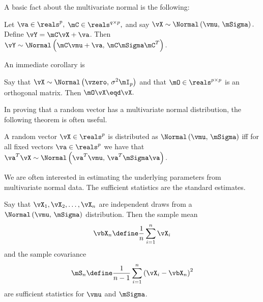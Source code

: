 A basic fact about the multivariate normal is the following:

\begin{proposition}\label{P:scale-shift-normal}
Let 
\(
    \va \in \reals^p,
\)
\(
    \mC \in \reals^{q \times p},
\)
and say
\(
    \vX 
    \sim
    \Normal \left( 
        \vmu, \,
        \mSigma
    \right).
\)
Define $\vY = \mC \vX + \va$.  Then 
\(
    \vY
    \sim
    \Normal \left( 
        \mC \vmu + \va, \,
        \mC \mSigma \mC^T
    \right).
\)
\end{proposition}

\noindent
An immediate corollary is

\begin{corollary}\label{C:normal-orthog-invariant}
Say that
\(
    \vX 
    \sim 
    \Normal \left( 
        \vzero, \,
        \sigma^2 \mI_p
    \right)
\)
and that
\(
    \mO \in \reals^{p \times p}
\)
is an orthogonal matrix.  Then
\(
    \mO \vX \eqd \vX.
\)
\end{corollary}

In proving that a random vector has a multivariate normal distribution,
the following theorem is often useful.

\begin{theorem}\label{T:cramer-wold}
A random vector
\(
    \vX \in \reals^p
\)
is distributed as 
\(
    \Normal \left(
        \vmu, \,
        \mSigma
    \right)
\)
iff for all fixed vectors
\(
    \va \in \reals^p
\)
we have that
\(
    \va^T \vX
    \sim
    \Normal \left(
        \va^T \vmu, \,
        \va^T \mSigma \va
    \right).
\)
\end{theorem}

We are often interested in estimating the underlying parameters from
multivariate normal data.  The sufficient statistics are the standard
estimates.

\begin{proposition}\label{P:normal-sufficient-stats}
Say that
\(
    \vX_1, \vX_2, \ldots, \vX_n
\) 
are independent draws from a
\(
    \Normal \left(
        \vmu, \,
        \mSigma
    \right)
\)
distribution.  Then the sample mean
\begin{equation}\label{E:sample-mean}
    \vbX_n
    \define
    \frac{1}{n}
    \sum_{i=1}^n
        \vX_i
\end{equation}
and the sample covariance
\begin{equation}\label{E:sample-covariance}
    \mS_n
    \define
    \frac{1}{n-1}
    \sum_{i=1}^n
        \left(
            \vX_i - \vbX_n
        \right)^2
\end{equation}
are sufficient statistics for $\vmu$ and $\mSigma$.
\end{proposition}

